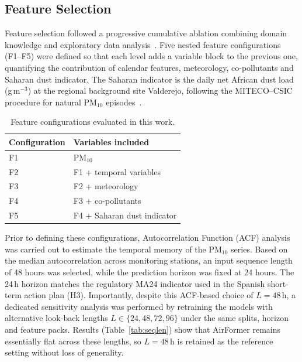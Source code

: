 \documentclass[11pt]{article}
\newenvironment{revnewblock}{%
  \begingroup\color{orange!75!black}%
}{%
  \endgroup%
}
\begin{document}
\begin{revnewblock}
\subsection{Feature Selection}
Feature selection followed a progressive cumulative ablation combining domain knowledge and exploratory data analysis~\cite{Zhang2026X2AQFormer}. Five nested feature configurations (F1--F5) were defined so that each level adds a variable block to the previous one, quantifying the contribution of calendar features, meteorology, co-pollutants and Saharan dust indicator. The Saharan indicator is the daily net African dust load (\textmu g\,m$^{-3}$) at the regional background site Valderejo, following the MITECO--CSIC procedure for natural PM$_{10}$ episodes~\cite{MITECO2013NaturalPM}.

\begin{table}[H]
\centering
\caption{Feature configurations evaluated in this work.}
\label{tab:features}
\begin{tabular}{ll}
\toprule
Configuration & Variables included\\
\midrule
F1 & PM$_{10}$\\
F2 & F1 + temporal variables\\
F3 & F2 + meteorology\\
F4 & F3 + co-pollutants\\
F5 & F4 + Saharan dust indicator\\
\bottomrule
\end{tabular}
\end{table}

Prior to defining these configurations, Autocorrelation Function (ACF) analysis was carried out to estimate the temporal memory of the PM$_{10}$ series. Based on the median autocorrelation across monitoring stations, an input sequence length of 48 hours was selected, while the prediction horizon was fixed at 24 hours. The 24\,h horizon matches the regulatory MA24 indicator used in the Spanish short-term action plan (H3). Importantly, despite this ACF-based choice of $L{=}48$\,h, a dedicated sensitivity analysis was performed by retraining the models with alternative look-back lengths $L\in\{24,48,72,96\}$ under the same splits, horizon and feature packs. Results (Table~\ref{tab:seqlen}) show that AirFormer remains essentially flat across these lengths, so $L{=}48$\,h is retained as the reference setting without loss of generality.


\end{revnewblock}
\end{document}
